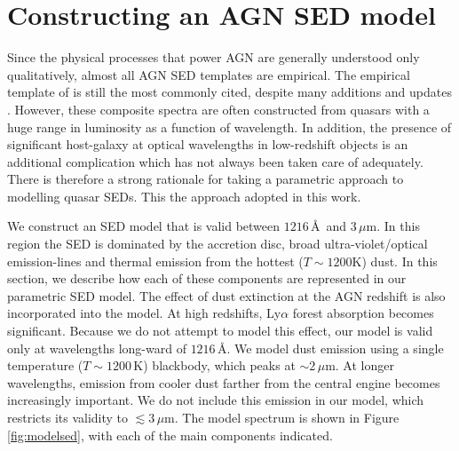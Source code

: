 \section{Constructing an AGN SED model}

Since the physical processes that power AGN are generally understood only qualitatively, almost all AGN SED templates are empirical. 
The empirical template of \citet{elvis94} is still the most commonly cited, despite many additions and updates \citep[e.g.][]{polletta00, kuraszkiewicz03, risaliti04, richards06,  polletta07, lusso10, shang11, marchese12, trichas12}. 
However, these composite spectra are often constructed from quasars with a huge range in luminosity as a function of wavelength. 
In addition, the presence of significant host-galaxy at optical wavelengths in low-redshift objects is an additional complication which has not always been taken care of adequately.
There is therefore a strong rationale for taking a parametric approach to modelling quasar SEDs. 
This the approach adopted in this work. 

We construct an SED model that is valid between $1216$\,\AA\, and $3$\,$\mu$m.
In this region the SED is dominated by the accretion disc, broad ultra-violet/optical emission-lines and thermal emission from the hottest ($T\sim1200$K) dust. 
In this section, we describe how each of these components are represented in our parametric SED model.  
The effect of dust extinction at the AGN redshift is also incorporated into the model. 
At high redshifts, Ly$\alpha$ forest absorption becomes significant. 
Because we do not attempt to model this effect, our model is valid only at wavelengths long-ward of $1216$\,\AA. 
We model dust emission using a single temperature ($T\sim1200$\,K) blackbody, which peaks at $\sim2$\,$\mu$m. 
At longer wavelengths, emission from cooler dust farther from the central engine becomes increasingly important. 
We do not include this emission in our model, which restricts its validity to $\lesssim3$\,$\mu$m.
The model spectrum is shown in Figure \ref{fig:modelsed}, with each of the main components indicated. 

